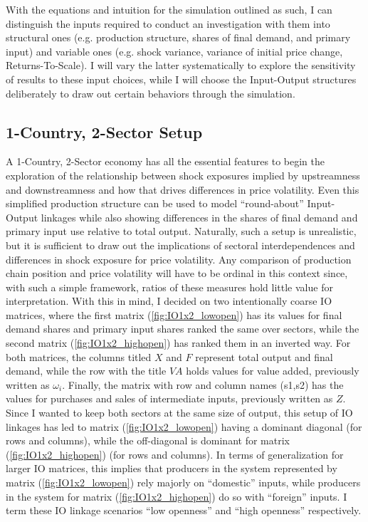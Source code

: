 With the equations and intuition for the simulation outlined as such, I can distinguish the inputs required to conduct an investigation
with them into structural ones (e.g. production structure, shares of final demand, and primary input) and variable ones (e.g. shock 
variance, variance of initial price change, Returns-To-Scale). I will vary the latter systematically to explore the sensitivity of 
results to these input choices, while I will choose the Input-Output structures deliberately to draw out certain behaviors through the 
simulation.

\subsection{1-Country, 2-Sector Setup}


A  1-Country, 2-Sector economy has all the essential features to begin the exploration of the relationship between shock exposures 
implied by upstreamness and downstreamness and how that drives differences in price volatility. Even this simplified production structure 
can be used to model ``round-about'' Input-Output linkages while also showing differences in the shares of final demand and primary input 
use relative to total output. Naturally, such a setup is unrealistic, but it is sufficient to draw out the implications of sectoral 
interdependences and differences in shock exposure for price volatility. Any comparison of production chain position and price volatility
will have to be ordinal in this context since, with such a simple framework, ratios of these measures hold little value for interpretation.
With this in mind, I decided on two intentionally coarse IO matrices, where the first matrix (\ref{fig:IO1x2_lowopen}) has its values for 
final demand shares and primary input shares ranked the same over sectors, while the second matrix (\ref{fig:IO1x2_highopen}) has ranked 
them in an inverted way. For both matrices, the columns titled $X$ and $F$ represent total output and final demand, while the row with the
title $VA$ holds values for value added, previously written as $\omega_i$. Finally, the matrix with row and column names (s1,s2) has the 
values for purchases and sales of intermediate inputs, previously written as $Z$. Since I wanted to keep both sectors at the same size 
of output, this setup of IO linkages has led to matrix (\ref{fig:IO1x2_lowopen}) having a dominant diagonal (for rows and columns), 
while the off-diagonal is dominant for matrix (\ref{fig:IO1x2_highopen}) (for rows and columns). In terms of generalization for larger 
IO matrices, this implies that producers in the system represented by matrix (\ref{fig:IO1x2_lowopen}) rely majorly on ``domestic'' 
inputs, while producers in the system for matrix (\ref{fig:IO1x2_highopen}) do so with ``foreign'' inputs. I term these IO linkage 
scenarios ``low openness'' and ``high openness'' respectively.

